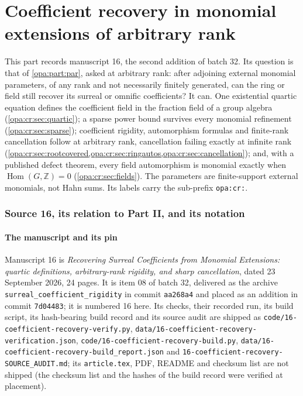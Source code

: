 \documentclass[11pt,oneside]{article}
\numberwithin{equation}{section}
\theoremstyle{definition}
\theoremstyle{remark}
\newcommand{\Z}{\mathbb Z}
\newcommand{\Hom}{\operatorname{Hom}}
\newcommand{\lbl}[1]{\nolinkurl{#1}}
\newcommand{\fn}[1]{\nolinkurl{#1}}
\begin{document}
\part{Coefficient recovery in monomial extensions of arbitrary rank}\label{opa:cr:part}

This part records manuscript 16, the second addition of batch 32. Its question is that of
\cref{opa:part:par}, asked at arbitrary rank: after adjoining external monomial parameters, of any
rank and not necessarily finitely generated, can the ring or field still recover its surreal or
omnific coefficients? It can. One existential quartic equation defines the coefficient field in the
fraction field of a group algebra (\cref{opa:cr:sec:quartic}); a sparse power bound survives every
monomial refinement (\cref{opa:cr:sec:sparse}); coefficient rigidity, automorphism formulas and
finite-rank cancellation follow at arbitrary rank, cancellation failing exactly at infinite rank
(\cref{opa:cr:sec:rootcovered,opa:cr:sec:ringautos,opa:cr:sec:cancellation}); and, with a published
defect theorem, every field automorphism is monomial exactly when $\Hom(G,\Z)=0$
(\cref{opa:cr:sec:fields}). The parameters are finite-support external monomials, not Hahn sums.
Its labels carry the sub-prefix \lbl{opa:cr:}.

\section{Source 16, its relation to Part II, and its notation}\label{opa:cr:sec:intro}

\subsection{The manuscript and its pin}\label{opa:cr:sub:source}

Manuscript 16 is \emph{Recovering Surreal Coefficients from Monomial Extensions: quartic definitions,
arbitrary-rank rigidity, and sharp cancellation}, dated 23 September 2026, 24 pages. It is item 08 of
batch 32, delivered as the archive \fn{surreal_coefficient_rigidity} in commit \texttt{aa268a4} and
placed as an addition in commit \texttt{7d04483}; it is numbered 16 here. Its checks, their recorded
run, its build script, its hash-bearing build record and its source audit are shipped as
\fn{code/16-coefficient-recovery-verify.py}, \fn{data/16-coefficient-recovery-verification.json},
\fn{code/16-coefficient-recovery-build.py}, \fn{data/16-coefficient-recovery-build_report.json} and
\fn{16-coefficient-recovery-SOURCE_AUDIT.md}; its \fn{article.tex}, PDF, README and checksum list are
not shipped (the checksum list and the hashes of the build record were verified at placement).
\end{document}
